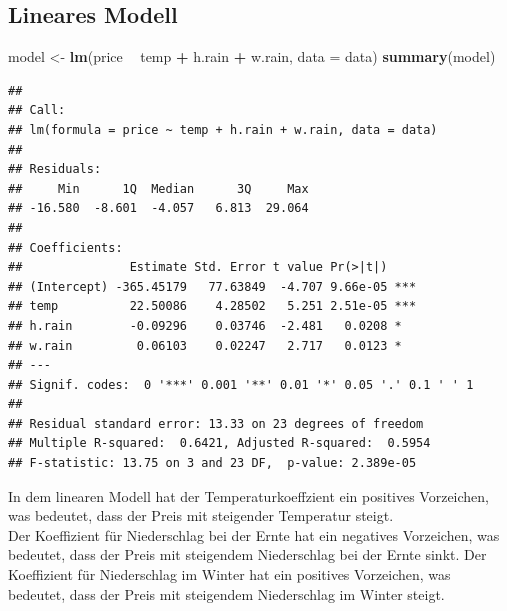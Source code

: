 \documentclass[]{article}
\newenvironment{Shaded}{\begin{snugshade}}{\end{snugshade}}
\newcommand{\DataTypeTok}[1]{\textcolor[rgb]{0.13,0.29,0.53}{#1}}
\newcommand{\KeywordTok}[1]{\textcolor[rgb]{0.13,0.29,0.53}{\textbf{#1}}}
\newcommand{\NormalTok}[1]{#1}
\newcommand{\OperatorTok}[1]{\textcolor[rgb]{0.81,0.36,0.00}{\textbf{#1}}}
\newcommand{\StringTok}[1]{\textcolor[rgb]{0.31,0.60,0.02}{#1}}
\begin{document}
\hypertarget{lineares-modell}{%
\subsection{Lineares Modell}\label{lineares-modell}}

\begin{Shaded}
\begin{Highlighting}[]
\NormalTok{model <-}\StringTok{ }\KeywordTok{lm}\NormalTok{(price }\OperatorTok{~}\StringTok{ }\NormalTok{temp }\OperatorTok{+}\StringTok{ }\NormalTok{h.rain }\OperatorTok{+}\StringTok{ }\NormalTok{w.rain, }\DataTypeTok{data =}\NormalTok{ data)}
\KeywordTok{summary}\NormalTok{(model)}
\end{Highlighting}
\end{Shaded}

\begin{verbatim}
## 
## Call:
## lm(formula = price ~ temp + h.rain + w.rain, data = data)
## 
## Residuals:
##     Min      1Q  Median      3Q     Max 
## -16.580  -8.601  -4.057   6.813  29.064 
## 
## Coefficients:
##               Estimate Std. Error t value Pr(>|t|)    
## (Intercept) -365.45179   77.63849  -4.707 9.66e-05 ***
## temp          22.50086    4.28502   5.251 2.51e-05 ***
## h.rain        -0.09296    0.03746  -2.481   0.0208 *  
## w.rain         0.06103    0.02247   2.717   0.0123 *  
## ---
## Signif. codes:  0 '***' 0.001 '**' 0.01 '*' 0.05 '.' 0.1 ' ' 1
## 
## Residual standard error: 13.33 on 23 degrees of freedom
## Multiple R-squared:  0.6421, Adjusted R-squared:  0.5954 
## F-statistic: 13.75 on 3 and 23 DF,  p-value: 2.389e-05
\end{verbatim}

In dem linearen Modell hat der Temperaturkoeffzient ein positives Vorzeichen, was bedeutet,
dass der Preis mit steigender Temperatur steigt.\\
Der Koeffizient für Niederschlag bei der Ernte hat ein negatives Vorzeichen, was bedeutet,
dass der Preis mit steigendem Niederschlag bei der Ernte sinkt.
Der Koeffizient für Niederschlag im Winter hat ein positives Vorzeichen, was bedeutet,
dass der Preis mit steigendem Niederschlag im Winter steigt.
\end{document}
